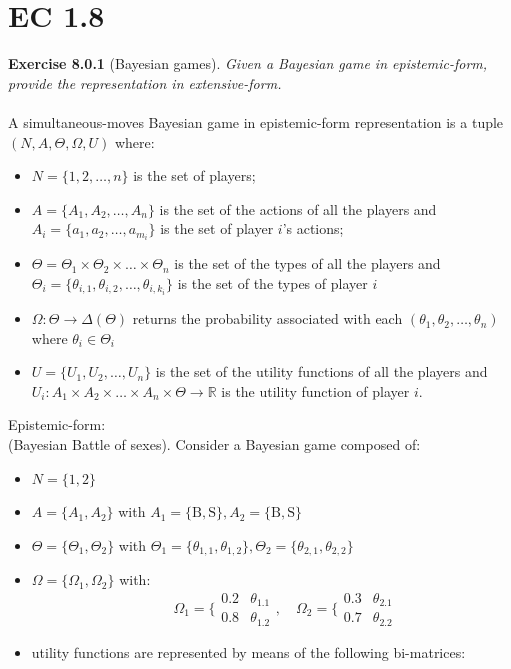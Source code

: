 \section{EC 1.8}
\textbf{Exercise 8.0.1} (Bayesian games). \textit{Given a Bayesian game in epistemic-form, provide the representation in extensive-form.}\\\\
A simultaneous-moves Bayesian game in epistemic-form representation is a tuple $(N, A, \Theta, \Omega, U)$ where:
\begin{itemize}
\item $ N = \{ 1, 2, \ldots, n \} $ is the set of players;
\item $ A = \{ A_{1}, A_{2}, \ldots, A_{n} \} $ is the set of the actions of all the players and $ A_{i} = \{ a_{1}, a_{2}, \ldots, a_{m_{i}} \} $ is the set of player $ i $'s actions;
\item $ \Theta = \Theta_{1} \times \Theta_{2} \times \ldots \times \Theta_{n} $ is the set of the types of all the players and $ \Theta_{i} = \{ \theta_{i, 1}, \theta_{i, 2}, \ldots, \theta_{i, k_{i}} \} $ is the set of the types of player $ i $
\item $ \Omega: \Theta \rightarrow \Delta(\Theta) $ returns the probability associated with each $ ( \theta_{1}, \theta_{2}, \ldots, \theta_{n} ) $ where $ \theta_{i} \in \Theta_{i} $
\item $ U= \{U_{1}, U_{2}, \ldots, U_{n} \} $ is the set of the utility functions of all the players and $ U_{i}: A_{1} \times A_{2} \times \ldots \times A_{n} \times \Theta \rightarrow \mathbb{R} $ is the utility function of player $ i $.
\end{itemize}
\noindent
Epistemic-form:\\
(Bayesian Battle of sexes). Consider a Bayesian game composed of:
\begin{itemize}
\item $ N = \{ 1, 2 \} $
\item $ A = \{A_{1}, A_{2} \} $ with $ A_{1} = \{ \mathrm{B}, \mathrm{S} \}, A_{2} = \{ \mathrm{B}, \mathrm{S} \} $
\item $ \Theta = \{ \Theta_{1}, \Theta_{2} \} $ with $ \Theta_{1} = \{ \theta_{1,1}, \theta_{1,2} \}, \Theta_{2} = \{ \theta_{2,1}, \theta_{2,2} \} $
\item $ \Omega= \{ \Omega_{1}, \Omega_{2} \} $ with:
$$
\qquad \Omega_{1}= \{ \begin{array}{ll}
									0.2 & \theta_{1.1} \\
									0.8 & \theta_{1.2}
					  \end{array}, 
\quad \Omega_{2} = \{ \begin{array}{ll}
									0.3 & \theta_{2.1} \\
									0.7 & \theta_{2.2}
					  \end{array}
$$
\item utility functions are represented by means of the following bi-matrices:
\end{itemize}
